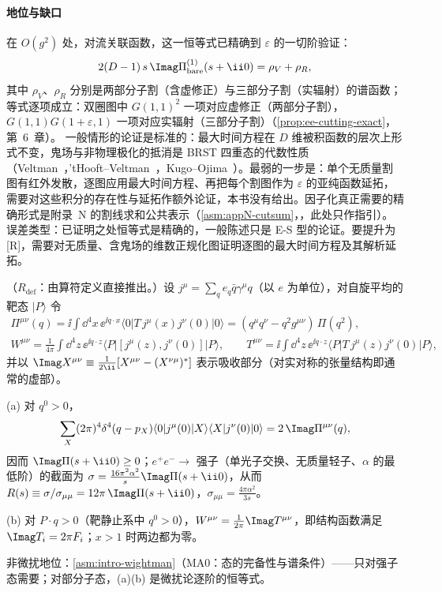 \paragraph{地位与缺口}
在 $O(g^2)$ 处，对流关联函数，这一恒等式已精确到 $\varepsilon$ 的一切阶验证：
\[
2(D-1)\,s\,\Imag\Pi^{(1)}_{\mathrm{bare}}(s+\ii0)=\rho_V+\rho_R , %
\]
其中 $\rho_V$、$\rho_R$ 分别是两部分子割（含虚修正）与三部分子割（实辐射）的谱函数；等式逐项成立：双圈图中 $G(1,1)^2$ 一项对应虚修正（两部分子割），$G(1,1)G(1+\varepsilon,1)$ 一项对应实辐射（三部分子割）（\cref{prop:ee-cutting-exact}，第~6~章）。
一般情形的论证是标准的：最大时间方程在 $D$ 维被积函数的层次上形式不变，鬼场与非物理极化的抵消是 BRST 四重态的代数性质（Veltman~\cite{Veltman1963}，'tHooft--Veltman~\cite{tHooftVeltman1972b,tHooftVeltman1974}，Kugo--Ojima~\cite{KugoOjima1979}）。最弱的一步是：单个无质量割图有红外发散，逐图应用最大时间方程、再把每个割图作为 $\varepsilon$ 的亚纯函数延拓，需要对这些积分的存在性与延拓作额外论证，本书没有给出。因子化真正需要的精确形式是附录~N 的割线求和公共表示（\cref{asm:appN-cutsum}，\tagA，此处只作指引）。误差类型：已证明之处恒等式是精确的，一般陈述只是 E-S 型的论证。要提升为 [R]，需要对无质量、含鬼场的维数正规化图证明逐图的最大时间方程及其解析延拓。

\begin{proposition}\label{prop:prelim-optical}
（$R_{\mathrm{def}}$：由算符定义直接推出。）设 $j^\mu=\sum_qe_q\bar q\gamma^\mu q$（以 $e$ 为单位），对自旋平均的靶态 $|P\rangle$ 令 %
\begin{gather*}
\Pi^{\mu\nu}(q)=\ii\int\dd^4x\,\ee^{\ii q\cdot x}\langle0|T\,j^\mu(x)j^\nu(0)|0\rangle=(q^\mu q^\nu-q^2g^{\mu\nu})\,\Pi(q^2),\\
W^{\mu\nu}=\frac1{4\pi}\int\dd^4z\,\ee^{\ii q\cdot z}\langle P|[j^\mu(z),j^\nu(0)]|P\rangle,\qquad
T^{\mu\nu}=\ii\int\dd^4z\,\ee^{\ii q\cdot z}\langle P|T\,j^\mu(z)j^\nu(0)|P\rangle ,
\end{gather*}
并以 $\Imag X^{\mu\nu}\equiv\frac1{2\ii}[X^{\mu\nu}-(X^{\nu\mu})^*]$ 表示吸收部分（对实对称的张量结构即通常的虚部）。
\par
(a) 对 $q^0>0$，
\begin{equation}\label{eq:prelim-optical-vac}
\sum_X(2\pi)^4\delta^4(q-p_X)\langle0|j^\mu(0)|X\rangle\langle X|j^\nu(0)|0\rangle=2\,\Imag\Pi^{\mu\nu}(q),
\end{equation}
因而 $\Imag\Pi(s+\ii0)\ge0$；$e^+e^-\to$ 强子（单光子交换、无质量轻子、$\alpha$ 的最低阶）的截面为 $\sigma=\frac{16\pi^2\alpha^2}{s}\Imag\Pi(s+\ii0)$，从而 $R(s)\equiv\sigma/\sigma_{\mu\mu}=12\pi\,\Imag\Pi(s+\ii0)$，$\sigma_{\mu\mu}=\frac{4\pi\alpha^2}{3s}$。
\par
(b) 对 $P\cdot q>0$（靶静止系中 $q^0>0$），$W^{\mu\nu}=\frac1{2\pi}\Imag T^{\mu\nu}$，即结构函数满足 $\Imag T_i=2\pi F_i$；$x>1$ 时两边都为零。
\par
非微扰地位：\cref{asm:intro-wightman}（MA0：态的完备性与谱条件）——只对强子态需要；对部分子态，(a)(b) 是微扰论逐阶的恒等式。
\end{proposition}

